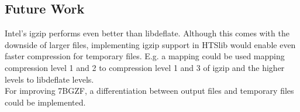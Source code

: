 \subsection{Future Work}
Intel's igzip performs even better than libdeflate. Although this comes with the downside of larger files, implementing igzip support in HTSlib would enable even faster compression for temporary files. E.g. a mapping could be used mapping compression level 1 and 2 to compression level 1 and 3 of igzip and the higher levels to libdeflate levels. \\
For improving 7BGZF, a differentiation between output files and temporary files could be implemented.